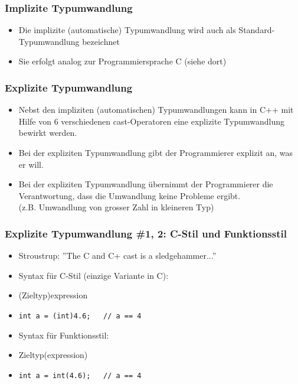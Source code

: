 \subsubsection{Implizite Typumwandlung\hfill}
\label{sec:unterunterabschnitt}
\begin{itemize}
	\item Die implizite (automatische) Typumwandlung wird auch als Standard-Typumwandlung bezeichnet
	\item Sie erfolgt analog zur Programmiersprache C (siehe dort)
\end{itemize}

\subsubsection{Explizite Typumwandlung\hfill}
\label{sec:unterunterabschnitt}
\begin{itemize}
	\item Nebst den impliziten (automatischen) Typumwandlungen kann in C++ mit Hilfe von 6 verschiedenen cast-Operatoren eine explizite Typumwandlung bewirkt werden.
	\item Bei der expliziten Typumwandlung gibt der Programmierer explizit an, was er will.
	\item[\-]
	\begin{achtung}
	Bei der expliziten Typumwandlung übernimmt der Programmierer die Verantwortung, dass die Umwandlung keine Probleme ergibt.\\
	(z.B. Umwandlung von grosser Zahl in kleineren Typ)
	\end{achtung}
\end{itemize}

\subsubsection{Explizite Typumwandlung \#1, 2: C-Stil und Funktionsstil\hfill}
\label{sec:unterunterabschnitt}
\begin{itemize}
	\item Stroustrup: ''The C and C+ cast is a sledgehammer...''
	\item Syntax für C-Stil (einzige Variante in C):
	\item[\-](Zieltyp)expression
	\item[\-]
\noindent
\begin{minipage}{\linewidth}
\begin{lstlisting}
int a = (int)4.6;	// a == 4
\end{lstlisting}
\end{minipage}
	\item Syntax für Funktionsstil:
	\item[\-] Zieltyp(expression)
	\item[\-]
\noindent
\begin{minipage}{\linewidth}
\begin{lstlisting}
int a = int(4.6);	// a == 4
\end{lstlisting}
\end{minipage}
\end{itemize}

